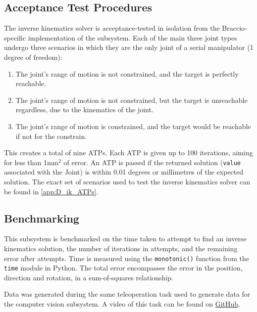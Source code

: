 \subsection{Acceptance Test Procedures}\label{ssec_ik:ATPs}
The inverse kinematics solver is acceptance-tested in isolation from the Braccio-specific implementation of the subsystem. Each of the main three joint types undergo three scenarios in which they are the only joint of a serial manipulator (1 degree of freedom):
\begin{enumerate}[nosep]
    \item The joint's range of motion is not constrained, and the target is perfectly reachable.
    \item The joint's range of motion is not constrained, but the target is unreachable regardless, due to the kinematics of the joint.
    \item The joint's range of motion is constrained, and the target would be reachable if not for the constrain.
\end{enumerate}

This creates a total of nine ATPs. Each ATP is given up to 100 iterations, aiming for less than 1mm$^2$ of error. An ATP is passed if the returned solution (\verb|value| associated with the Joint) is within 0.01 degrees or millimetres of the expected solution. The exact set of scenarios used to test the inverse kinematics solver can be found in \autoref{app:D_ik_ATPs}.

\subsection{Benchmarking}
This subsystem is benchmarked on the time taken to attempt to find an inverse kinematics solution, the number of iterations in attempts, and the remaining error after attempts. Time is measured using the \verb|monotonic()| function from the \verb|time| module in Python. The total error encompasses the error in the position, direction and rotation, in a sum-of-squares relationship.

Data was generated during the same teleoperation task used to generate data for the computer vision subsystem. A video of this task can be found on \href{https://github.com/Neo-Vorsatz-UCT/eee4022s/blob/main/data/EEE4022S_TDR-04_Demo.mp4}{GitHub}.
